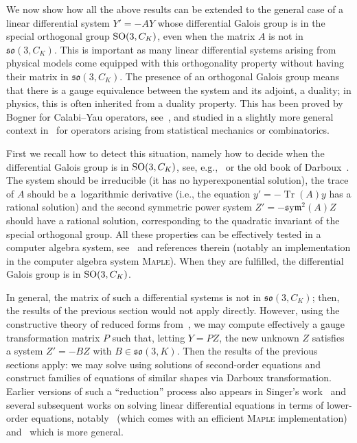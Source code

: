 \documentclass[10pt,a4paper]{amsart}
\numberwithin{equation}{section}
\def\sym{\mathfrak{s}\mathrm{y}\mathfrak{m}}
\begin{document}
We now show how all the above results can be extended to the general case of a linear differential system $Y' = -A Y$ whose differential Galois group is in the special orthogonal group ${\rm SO}(3, C_K)$, even when the
 matrix $A$ is not in $\mathfrak{so}(3, C_K)$. This is important as many linear differential systems arising from physical models come equipped with this orthogonality property without having their matrix in $\mathfrak{so}(3, C_K)$. The presence of an orthogonal Galois group means that there is a gauge equivalence between the system and its adjoint, a duality; in physics, this is often inherited from a duality property. This has been proved by Bogner for Calabi--Yau operators, see~\cite{Bo13a,BoRe13a}, and studied in a slightly more general context in~\cite{BoBoMaWe15a,BoHaMaWe14a,BoHaMaWe15a} for operators arising from statistical mechanics or combinatorics.

First we recall how to detect this situation, namely how to decide
when the differential Galois group is in ${\rm SO}(3, C_K)$, see, e.g.,~\cite{NgPu10a,Si88a,Ho07a} or the old book of Darboux~\cite[pp.~28--29]{da3}. The system should be irreducible (it has no hyperexponential solution), the trace of $A$ should be a~logarithmic derivative (i.e., the equation $y'=-\operatorname{Tr}(A)y$ has a rational solution) and the second symmetric power system $Z' = -\sym^2(A) Z$ should have a rational solution, corresponding to the quadratic invariant of the special orthogonal group. All these properties can be effectively tested in a computer algebra system, see~\cite{BaClElWe12a} and references therein (notably an implementation in the computer algebra system \textsc{Maple}).
When they are fulfilled, the differential Galois group is in ${\rm SO}(3, C_K)$.

In general, the matrix of such a differential systems is not in $\mathfrak{so}(3, C_K)$; then, the results of the previous section would not apply directly. However, using the constructive theory of reduced forms from~\cite{BaClDiWe20a, BaClDiWe16a}, we may compute effectively a gauge transformation matrix $P$ such that, letting $Y=PZ$, the new unknown $Z$ satisfies a system $Z'=-BZ$ with $B\in \mathfrak{so}(3, K)$. Then the results of the previous sections apply: we may solve using solutions of second-order equations and construct families of equations of similar shapes via Darboux transformation.
Earlier versions of such a ``reduction'' process also appears in Singer's work~\cite{Si88a} and several subsequent works on solving linear differential equations in terms of lower-order equations, notably~\cite{Ho07a} (which comes with an efficient \textsc{Maple} implementation) and~\cite{NgPu10a} which is more general.
\end{document}
